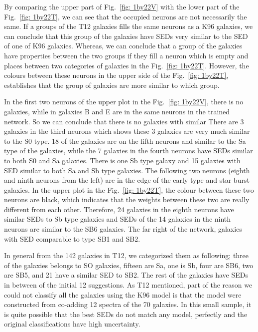             By comparing the upper part of Fig.~\ref{fig: 1by22V} with the lower part of the Fig.~\ref{fig: 1by22T}, we can see that the occupied neurons are not necessarily the same.
            If a groups of the T12 galaxies fills the same neurons as a K96 galaxies, we can conclude that this group of the galaxies have SEDs very similar to the SED of one of K96 galaxies.
            Whereas, we can conclude that a group of the galaxies have properties between the two groups if they fill a neuron which is empty and places between two categories of galaxies in the Fig.~\ref{fig: 1by22T}.
            However, the colours between these neurons in the upper side of the Fig.~\ref{fig: 1by22T}, establishes that the group of galaxies are more similar to which group.
            
            In the first two neurons of the upper plot in the Fig.~\ref{fig: 1by22V}, there is no galaxies, while in galaxies B and E are in the same neurons in the trained network.
            So we can conclude that there is no galaxies with similar
            There are 3 galaxies in the third neurons which shows these 3 galaxies are very much similar to the S0 type. 
            18 of the galaxies are on the fifth neurons and similar to the Sa type of the galaxies, while the 7 galaxies in the fourth neurons have SEDs similar to both S0 and Sa galaxies.
            There is one Sb type galaxy and 15 galaxies with SED similar to both Sa and Sb type galaxies.
            The following two neurons (eighth and ninth neurons from the left) are in the edge of the early type and star burst galaxies.
            In the upper plot in the  Fig.~\ref{fig: 1by22T}, the colour between these two neurons are black, which indicates that the weights between these two are really different from each other.
            Therefore, 24 galaxies in the eighth neurons have similar SEDs to Sb type galaxies and SEDs of the 14 galaxies in the ninth neurons are similar to the SB6 galaxies.
            The far right of the network, galaxies with SED comparable to type SB1 and SB2.
            
            In general from the 142 galaxies in T12, we categorized them as following; three of the galaxies belongs to SO galaxies, fifteen are Sa, one is Sb, four are SB6, two are SB5, and 21 have a similar SED to SB2.
            The rest of the galaxies have SEDs in between of the initial 12 suggestions.
            As T12 mentioned, part of the reason we could not classify all the galaxies using the K96 model is that the model were constructed from co-adding 12 spectra of the 70 galaxies.
            In this small sample, it is quite possible that the best SEDs do not match any model, perfectly and the original classifications have high uncertainty.
            

